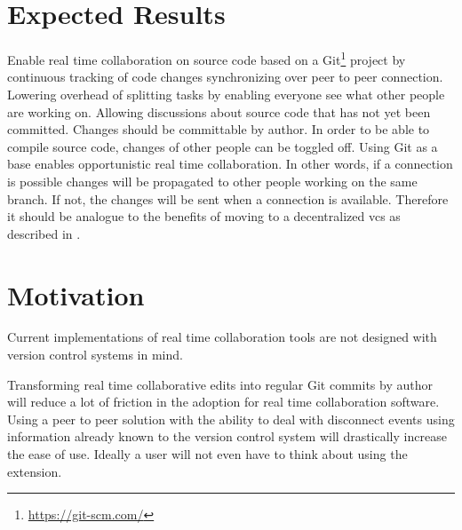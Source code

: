 \section{Expected Results}

Enable real time collaboration on source code based on a Git\footnote{\href{https://git-scm.com/}{https://git-scm.com/}} project by
continuous tracking of code changes synchronizing over peer to peer connection.
Lowering overhead of splitting tasks by enabling everyone see what other people are working on. Allowing discussions about source code that has not yet been committed.
Changes should be committable by author. In order to be able to compile source code, changes of other people can be toggled off.
Using Git as a base enables opportunistic real time collaboration. In other words, if a connection is possible changes will be propagated  to other people working on the same branch. If not, the changes will be sent when a connection is available. \cite{6188603} Therefore it should be analogue to the benefits of moving to a decentralized vcs as described in \cite{AlwisSillito:2009:centralToDecentralVCS}.

\section{Motivation}

Current implementations of real time collaboration tools are not designed with version control systems in mind.

Transforming real time collaborative edits into regular Git commits by author will reduce a lot of friction in the adoption for real time collaboration software. Using a peer to peer solution with the ability to deal with disconnect events using information already known to the version control system will drastically increase the ease of use. Ideally a user will not even have to think about using the extension.